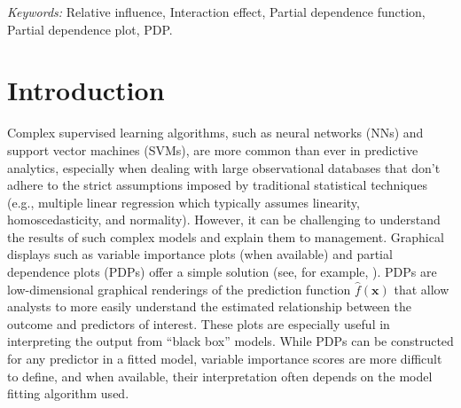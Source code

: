 \documentclass[12pt]{article}
\begin{document}
\noindent%
{\it Keywords:} Relative influence, Interaction effect, Partial dependence function, Partial dependence plot, PDP.
\vfill

\newpage
{} %


\section{Introduction}
\label{sec:introduction}

Complex supervised learning algorithms, such as neural networks (NNs) and support vector machines (SVMs), are more common than ever in predictive analytics, especially when dealing with large observational databases that don't adhere to the strict assumptions imposed by traditional statistical techniques (e.g., multiple linear regression which typically assumes linearity, homoscedasticity, and normality). However, it can be challenging to understand the results of such complex models and explain them to management. Graphical displays such as variable importance plots (when available) and partial dependence plots (PDPs) \citep{friedman-2001-greedy} offer a simple solution (see, for example, \citep[pp. 367--380]{hastie-elements-2009}). PDPs are low-dimensional graphical renderings of the prediction function $\widehat{f}\left(\boldsymbol{x}\right)$ that allow analysts to more easily understand the estimated relationship between the outcome and predictors of interest. These plots are especially useful in interpreting the output from ``black box'' models. While PDPs can be constructed for any predictor in a fitted model, variable importance scores are more difficult to define, and when available, their interpretation often depends on the model fitting algorithm used. 

\end{document}
